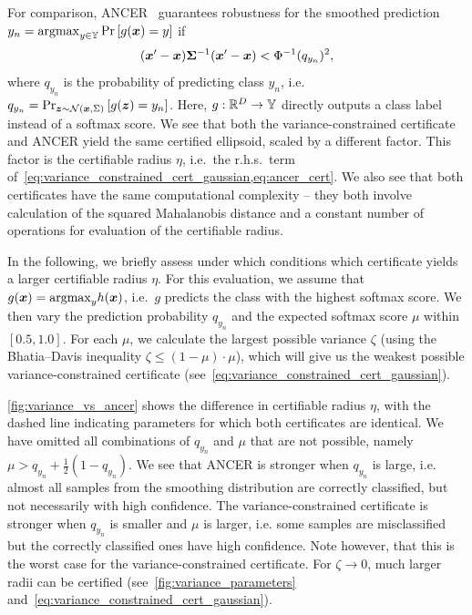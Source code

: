 For comparison, ANCER~\citep{Eiras2021} guarantees robustness for the smoothed prediction $y_n = \mathrm{argmax}_{y \in {\mathbb{Y}}} \Pr\left[g({\bm{x}})=y\right]$ if
\begin{equation}\label{eq:ancer_cert}
    ({\bm{x}}' - {\bm{x}}) {\bm{\Sigma}}^{-1} ({\bm{x}}' - {\bm{x}}) < \Phi^{-1}(q_{y_n})^2,
\end{equation}
where $q_{y_n}$ is the probability of predicting class $y_n$, i.e.\
$q_{y_n} = \Pr_{{\bm{z}} \sim \mathcal{N}({\bm{x}}, \Sigma)} \left[g({\bm{z}}) = y_n\right]$. Here, $g : {\mathbb{R}}^{D} \rightarrow {\mathbb{Y}}$ directly outputs a class label instead of a softmax score.
We see that both the variance-constrained certificate and ANCER yield the same certified ellipsoid, scaled by a different factor. This factor is the certifiable radius $\eta$, i.e.\ the r.h.s.\ term of~\cref{eq:variance_constrained_cert_gaussian,eq:ancer_cert}.
We also see that both certificates have the same computational complexity -- they both involve calculation of the squared Mahalanobis distance and a constant number of operations for evaluation of the certifiable radius.

In the following, we briefly assess under which conditions which certificate yields a larger certifiable radius $\eta$.
For this evaluation, we assume that $g({\bm{x}}) = \mathrm{argmax}_y h({\bm{x}})$, i.e.\ $g$ predicts the class with the highest softmax score.
We then vary the prediction probability $q_{y_n}$ and the expected softmax score $\mu$ within $[0.5,1.0]$. For each $\mu$, we calculate the largest possible variance $\zeta$ (using the Bhatia–Davis inequality $\zeta \leq (1 - \mu) \cdot \mu$), which will give us the weakest possible variance-constrained certificate (see~\cref{eq:variance_constrained_cert_gaussian}).

\cref{fig:variance_vs_ancer} shows the difference in certifiable radius $\eta$, with the dashed line indicating parameters for which both certificates are identical.
We have omitted all combinations of $q_{y_n}$ and $\mu$ that are not possible, namely $\mu > q_{y_n} + \frac{1}{2} (1 - q_{y_n})$.
We see that ANCER is stronger when $q_{y_n}$ is large, i.e. almost all samples from the smoothing distribution are correctly classified, but not necessarily with high confidence.
The variance-constrained certificate is stronger when $q_{y_n}$ is smaller and $\mu$ is larger, i.e. some samples are misclassified but the correctly classified ones have high confidence.
Note however, that this is the worst case for the variance-constrained certificate. For $\zeta \to 0$, much larger radii can be certified (see~\cref{fig:variance_parameters} and~\cref{eq:variance_constrained_cert_gaussian}).

